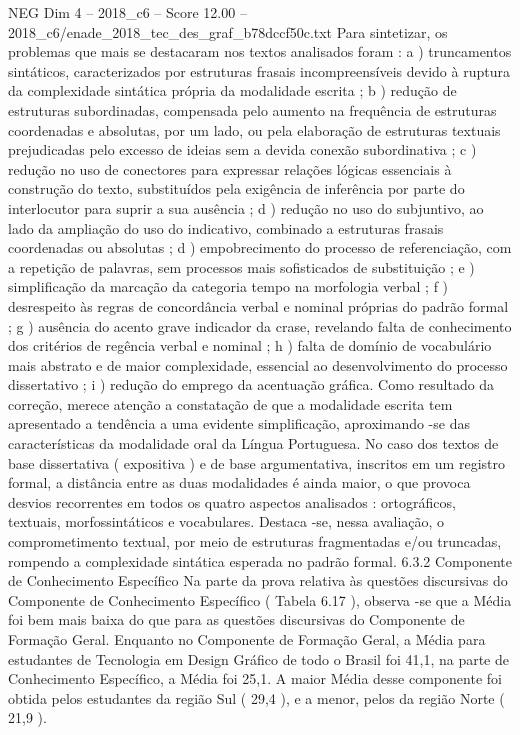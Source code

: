\begin{textsample}{NEG Dim 4 – 2018\_c6 – Score 12.00 – 2018\_c6/enade\_2018\_tec\_des\_graf\_b78dccf50c.txt}
Para sintetizar, os problemas que mais se destacaram nos textos analisados foram : a ) truncamentos sintáticos, caracterizados por estruturas frasais incompreensíveis devido à ruptura da complexidade sintática própria da modalidade escrita ; b ) redução de estruturas subordinadas, compensada pelo aumento na frequência de estruturas coordenadas e absolutas, por um lado, ou pela elaboração de estruturas textuais prejudicadas pelo excesso de ideias sem a devida conexão subordinativa ; c ) redução no uso de conectores para expressar relações lógicas essenciais à construção do texto, substituídos pela exigência de inferência por parte do interlocutor para suprir a sua ausência ; d ) redução no uso do subjuntivo, ao lado da ampliação do uso do indicativo, combinado a estruturas frasais coordenadas ou absolutas ; d ) empobrecimento do processo de referenciação, com a repetição de palavras, sem processos mais sofisticados de substituição ; e ) simplificação da marcação da categoria tempo na morfologia verbal ; f ) desrespeito às regras de concordância verbal e nominal próprias do padrão formal ; g ) ausência do acento grave indicador da crase, revelando falta de conhecimento dos critérios de regência verbal e nominal ; h ) falta de domínio de vocabulário mais abstrato e de maior complexidade, essencial ao desenvolvimento do processo dissertativo ; i ) redução do emprego da acentuação gráfica.
Como resultado da correção, merece atenção a constatação de que a modalidade escrita tem apresentado a tendência a uma evidente simplificação, aproximando -se das características da modalidade oral da Língua Portuguesa.
No caso dos textos de base dissertativa ( expositiva ) e de base argumentativa, inscritos em um registro formal, a distância entre as duas modalidades é ainda maior, o que provoca desvios recorrentes em todos os quatro aspectos analisados : ortográficos, textuais, morfossintáticos e vocabulares.
Destaca -se, nessa avaliação, o comprometimento textual, por meio de estruturas fragmentadas e/ou truncadas, rompendo a complexidade sintática esperada no padrão formal. 6.3.2 Componente de Conhecimento Específico Na parte da prova relativa às questões discursivas do Componente de Conhecimento Específico ( Tabela 6.17 ), observa -se que a Média foi bem mais baixa do que para as questões discursivas do Componente de Formação Geral.
Enquanto no Componente de Formação Geral, a Média para estudantes de Tecnologia em Design Gráfico de todo o Brasil foi 41,1, na parte de Conhecimento Específico, a Média foi 25,1.
A maior Média desse componente foi obtida pelos estudantes da região Sul ( 29,4 ), e a menor, pelos da região Norte ( 21,9 ).

\end{textsample}
